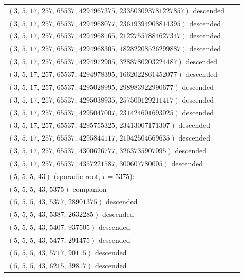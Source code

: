 \documentclass[11pt]{article}
\theoremstyle{definition}
\theoremstyle{remark}
\newcommand{\eps}{\tilde{\epsilon}}
\begin{document}
\begin{longtable}{@{}p{0.95\linewidth}@{}}
\quad $(3,\,5,\,17,\,257,\,65537,\,4294967375,\,233503093781227857)$ \hfill {\small descended} \\
\quad $(3,\,5,\,17,\,257,\,65537,\,4294968077,\,23619394908814395)$ \hfill {\small descended} \\
\quad $(3,\,5,\,17,\,257,\,65537,\,4294968165,\,21227557884627347)$ \hfill {\small descended} \\
\quad $(3,\,5,\,17,\,257,\,65537,\,4294968305,\,18282208526299887)$ \hfill {\small descended} \\
\quad $(3,\,5,\,17,\,257,\,65537,\,4294972905,\,3288780203224487)$ \hfill {\small descended} \\
\quad $(3,\,5,\,17,\,257,\,65537,\,4294978395,\,1662022861452077)$ \hfill {\small descended} \\
\quad $(3,\,5,\,17,\,257,\,65537,\,4295028995,\,298983922990677)$ \hfill {\small descended} \\
\quad $(3,\,5,\,17,\,257,\,65537,\,4295038935,\,257500129211417)$ \hfill {\small descended} \\
\quad $(3,\,5,\,17,\,257,\,65537,\,4295047007,\,231424601693025)$ \hfill {\small descended} \\
\quad $(3,\,5,\,17,\,257,\,65537,\,4295755325,\,23413007171307)$ \hfill {\small descended} \\
\quad $(3,\,5,\,17,\,257,\,65537,\,4295844117,\,21042504669635)$ \hfill {\small descended} \\
\quad $(3,\,5,\,17,\,257,\,65537,\,4300626777,\,3263735907095)$ \hfill {\small descended} \\
\quad $(3,\,5,\,17,\,257,\,65537,\,4357221587,\,300607780005)$ \hfill {\small descended} \\
\addlinespace
\textbf{$(5,\,5,\,5,\,43)$} \quad (sporadic root, $\eps = 5375$): \\
\quad $(5,\,5,\,5,\,43,\,5375)$ \hfill {\small companion} \\
\quad $(5,\,5,\,5,\,43,\,5377,\,28901375)$ \hfill {\small descended} \\
\quad $(5,\,5,\,5,\,43,\,5387,\,2632285)$ \hfill {\small descended} \\
\quad $(5,\,5,\,5,\,43,\,5407,\,937505)$ \hfill {\small descended} \\
\quad $(5,\,5,\,5,\,43,\,5477,\,291475)$ \hfill {\small descended} \\
\quad $(5,\,5,\,5,\,43,\,5717,\,90115)$ \hfill {\small descended} \\
\quad $(5,\,5,\,5,\,43,\,6215,\,39817)$ \hfill {\small descended} \\

\end{longtable}
\end{document}
